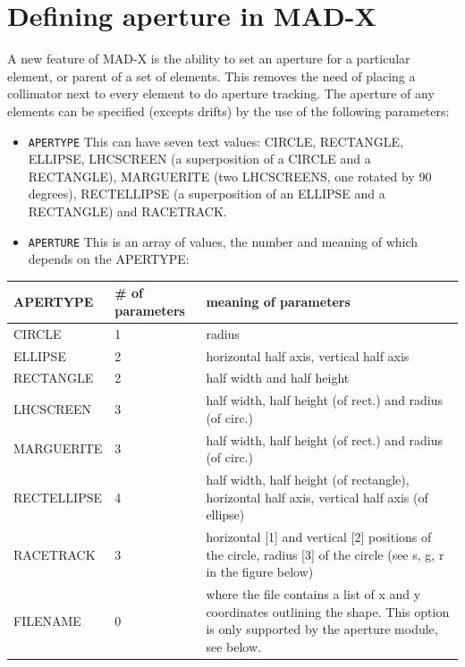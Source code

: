  
\chapter{Defining aperture in MAD-X}

A new feature of MAD-X is the ability to set an aperture for a particular  element, or parent of a set of elements. This removes the need of placing a collimator next to every element to do aperture tracking.  The aperture of any elements can be specified (excepts drifts) by the use of the following parameters: 

\begin{itemize}
	\item \texttt{APERTYPE} This can have seven text values: CIRCLE, RECTANGLE, ELLIPSE, LHCSCREEN (a superposition of a CIRCLE and a RECTANGLE), MARGUERITE (two LHCSCREENS, one rotated by 90 degrees),  RECTELLIPSE (a superposition of an ELLIPSE and a RECTANGLE) and RACETRACK. 
	\item \texttt{APERTURE} This is an array of values, the number and meaning  of which depends on the APERTYPE: 
\end{itemize}

\begin{tabular}{l | l | p{9cm}|}
\hline 
\textbf{APERTYPE} & \textbf{\# of parameters} & \textbf{meaning of parameters} \\ 
\hline
CIRCLE & 1 &  radius \\ 
\hline
ELLIPSE & 2 & horizontal half axis, vertical half axis \\ 
\hline
RECTANGLE & 2 & half width and half height \\ 
\hline
LHCSCREEN & 3 & half width, half height (of rect.) and radius (of circ.) \\ 
\hline
MARGUERITE & 3 & half width, half height (of rect.) and radius (of circ.) \\ 
\hline
RECTELLIPSE & 4 & half width, half height (of rectangle), horizontal half axis, vertical half axis (of ellipse) \\ 
\hline
RACETRACK & 3 & horizontal [1] and vertical [2] positions of the circle, radius [3] of the circle (see s, g, r in the figure below) \\ 
\hline
FILENAME & 0 & where the file contains a list of x and y coordinates outlining the shape. This option is only supported by the aperture module, see below. \\ 
\hline
\end{tabular}

